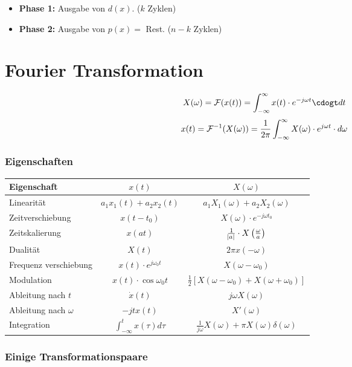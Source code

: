 \documentclass[a4paper]{article}
\begin{document}
\begin{twocolumn}
\begin{itemize}
  \item \textbf{\color{cBlue} Phase 1:} Ausgabe von $d(x)$. ($k$ Zyklen)
  \item \textbf{\color{cRed}  Phase 2:} Ausgabe von $p(x) = $ Rest. ($n-k$ Zyklen)
\end{itemize}

\section{Fourier Transformation}
$$X(\omega) = \fourier(x(t)) = \int_{-\infty}^\infty x(t) \cdot e^{-j \omega t} \cdogt dt $$
$$x(t) = \mathcal{F}^{-1}(X(\omega)) = \frac{1}{2\pi} \int_{-\infty}^\infty X(\omega) \cdot e^{j \omega t} \cdot d\omega$$

\subsubsection{Eigenschaften}
\begin{tabular}{lcc}
  Eigenschaft & $x(t)$ & $X(\omega)$ \\
  \toprule
  Linearität & $a_1 x_1(t) + a_2 x_2(t)$ & $a_1 X_1(\omega) + a_2 X_2(\omega)$ \\
  Zeitverschiebung & $x(t-t_0)$ & $X(\omega) \cdot e^{-j \omega t_0}$ \\
  Zeitskalierung & $x(at)$ & $\frac{1}{\abs{a}} \cdot X\left(\frac{\omega}{a}\right)$ \\
  Dualität & $X(t)$ & $2 \pi x(-\omega)$ \\
  Frequenz verschiebung & $x(t) \cdot e^{j \omega_0 t}$ & $X(\omega - \omega_0)$ \\
  Modulation & $x(t) \cdot \cos \omega_0 t$ & $\frac{1}{2} \left[ X(\omega - \omega_0) + X(\omega + \omega_0) \right]$ \\
  Ableitung nach $t$ & $\dot{x}(t)$ & $j \omega X(\omega)$ \\
  Ableitung nach $\omega$ & $-j t x(t)$ & $X'(\omega)$ \\
  Integration & $\int_{-\infty}^t x(\tau) d\tau$ & $\frac{1}{j\omega} X(\omega) + \pi X(\omega) \delta(\omega)$  \\
\end{tabular}

\subsubsection{Einige Transformationspaare}


\end{twocolumn}
\end{document}
